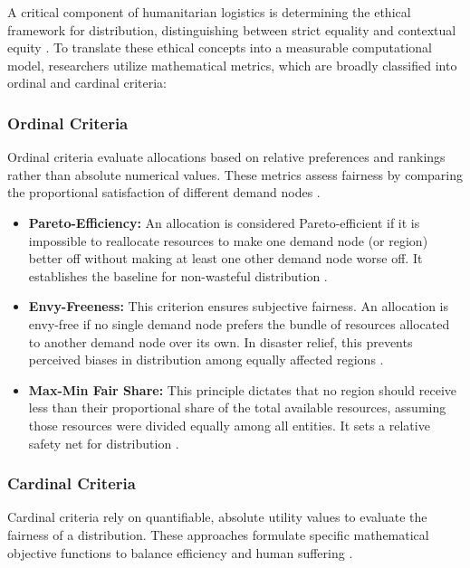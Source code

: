 A critical component of humanitarian logistics is determining the ethical framework for distribution, distinguishing between strict equality and contextual equity \cite{huang2012}. To translate these ethical concepts into a measurable computational model, researchers utilize mathematical metrics, which are broadly classified into ordinal and cardinal criteria:

\subsubsection{Ordinal Criteria}
Ordinal criteria evaluate allocations based on relative preferences and rankings rather than absolute numerical values. These metrics assess fairness by comparing the proportional satisfaction of different demand nodes \cite{gutjahr2018, huang2012}.

\begin{itemize}
    \item \textbf{Pareto-Efficiency:} An allocation is considered Pareto-efficient if it is impossible to reallocate resources to make one demand node (or region) better off without making at least one other demand node worse off. It establishes the baseline for non-wasteful distribution \cite{gutjahr2018}.
    \item \textbf{Envy-Freeness:} This criterion ensures subjective fairness. An allocation is envy-free if no single demand node prefers the bundle of resources allocated to another demand node over its own. In disaster relief, this prevents perceived biases in distribution among equally affected regions \cite{gutjahr2018}.
    \item \textbf{Max-Min Fair Share:} This principle dictates that no region should receive less than their proportional share of the total available resources, assuming those resources were divided equally among all entities. It sets a relative safety net for distribution \cite{huang2012}.
\end{itemize}

\subsubsection{Cardinal Criteria}
Cardinal criteria rely on quantifiable, absolute utility values to evaluate the fairness of a distribution. These approaches formulate specific mathematical objective functions to balance efficiency and human suffering \cite{vitoriano2011}.

